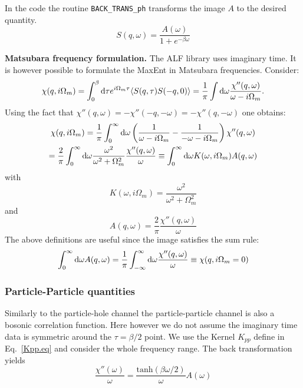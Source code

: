 In the code the routine \texttt{BACK\_TRANS\_ph}   transforms the image $A$ to the desired quantity.
\begin{equation}
	S(q,\omega) = \frac{A(\omega)}{1 + e^{-\beta \omega} }  
\end{equation}

\noindent
\textbf{Matsubara frequency formulation.}
The ALF  library uses  imaginary time. It is however possible to formulate the MaxEnt in  Matsubara frequencies.
Consider:
\begin{equation}
  \chi(q,i\Omega_m) = \int_0^{\beta} {\text d} \tau  e^{i \Omega_m \tau}
	\langle S(q,\tau) S(-q,0) \rangle  = \frac{1}{\pi}
   \int {\text d} \omega  \frac{\chi''(q,\omega)}{ \omega - i \Omega_m }.
\end{equation}
Using the fact that $\chi''(q,\omega) = -\chi''(-q,-\omega) = -\chi''(q,-\omega)$ one obtains:
\begin{equation}
\begin{gathered}
  \chi(q,i\Omega_m) = 
	\frac{1}{\pi}
   \int_0^{\infty} {\text d} \omega \left(\frac{1}{ \omega - i \Omega_m } - \frac{1}{ -\omega - i \Omega_m } \right)
         \chi''(q,\omega) \\
    = \frac{2}{\pi} \int_0^{\infty} {\text d} \omega \frac{\omega^2}{ \omega^2  + \Omega_m^2 } 
  \frac{\chi''(q,\omega)}{\omega} 
   \equiv \int_0^{\infty} {\text d} \omega K(\omega,i\Omega_m) A(q,\omega)
\end{gathered}
\end{equation}
with
\begin{equation}
   K(\omega,i\Omega_m) = \frac{\omega^2}{ \omega^2  + \Omega_m^2 } 
\end{equation}
and
\begin{equation}
A(q,\omega) =  \frac{2}{\pi}   \frac{\chi''(q,\omega)}{\omega} 
\end{equation}
The above definitions are useful since the image satisfies the sum rule:
\begin{equation}
\int_0^{\infty} {\text d} \omega A(q,\omega) =  \frac{1}{\pi}  \int_{-\infty}^{\infty} {\text d} \omega 
   \frac{\chi''(q,\omega)}{\omega}   \equiv \chi(q,i\Omega_m=0)
\end{equation}


\subsubsection{Particle-Particle quantities}

Similarly to the particle-hole channel  the particle-particle channel is also a bosonic correlation function. Here however we do not assume the 
imaginary time data is symmetric around   the $\tau = \beta/2$ point.  We use the Kernel $K_{pp}$ define in Eq.~\ref{Kpp.eq}  and consider the whole frequency range. 
The back transformation  yields
\begin{equation}
 \frac{\chi''(\omega)} {\omega}   = \frac{\text{tanh} \left( \beta \omega/2 \right) }{ \omega }   A(\omega) 
\end{equation}



